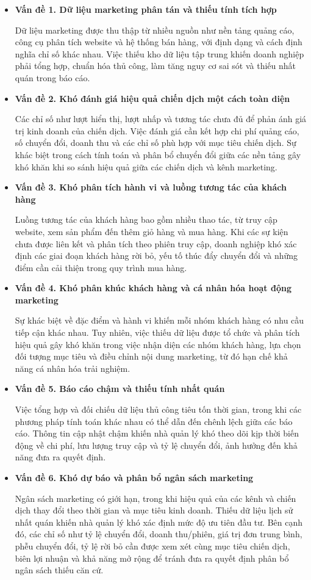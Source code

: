 \begin{itemize}
  \item \textbf{Vấn đề 1. Dữ liệu marketing phân tán và thiếu tính tích hợp}

  Dữ liệu marketing được thu thập từ nhiều nguồn như nền tảng quảng cáo, công cụ phân tích website và hệ thống bán hàng, với định dạng và cách định nghĩa chỉ số khác nhau. Việc thiếu kho dữ liệu tập trung khiến doanh nghiệp phải tổng hợp, chuẩn hóa thủ công, làm tăng nguy cơ sai sót và thiếu nhất quán trong báo cáo.
  \item \textbf{Vấn đề 2. Khó đánh giá hiệu quả chiến dịch một cách toàn diện}

  Các chỉ số như lượt hiển thị, lượt nhấp và tương tác chưa đủ để phản ánh giá trị kinh doanh của chiến dịch. Việc đánh giá cần kết hợp chi phí quảng cáo, số chuyển đổi, doanh thu và các chỉ số phù hợp với mục tiêu chiến dịch. Sự khác biệt trong cách tính toán và phân bổ chuyển đổi giữa các nền tảng gây khó khăn khi so sánh hiệu quả giữa các chiến dịch và kênh marketing.
  \item \textbf{Vấn đề 3. Khó phân tích hành vi và luồng tương tác của khách hàng}

  Luồng tương tác của khách hàng bao gồm nhiều thao tác, từ truy cập website, xem sản phẩm đến thêm giỏ hàng và mua hàng. Khi các sự kiện chưa được liên kết và phân tích theo phiên truy cập, doanh nghiệp khó xác định các giai đoạn khách hàng rời bỏ, yếu tố thúc đẩy chuyển đổi và những điểm cần cải thiện trong quy trình mua hàng.
  \item \textbf{Vấn đề 4. Khó phân khúc khách hàng và cá nhân hóa hoạt động marketing}

  Sự khác biệt về đặc điểm và hành vi khiến mỗi nhóm khách hàng có nhu cầu tiếp cận khác nhau. Tuy nhiên, việc thiếu dữ liệu được tổ chức và phân tích hiệu quả gây khó khăn trong việc nhận diện các nhóm khách hàng, lựa chọn đối tượng mục tiêu và điều chỉnh nội dung marketing, từ đó hạn chế khả năng cá nhân hóa trải nghiệm.
  \item \textbf{Vấn đề 5. Báo cáo chậm và thiếu tính nhất quán}

  Việc tổng hợp và đối chiếu dữ liệu thủ công tiêu tốn thời gian, trong khi các phương pháp tính toán khác nhau có thể dẫn đến chênh lệch giữa các báo cáo. Thông tin cập nhật chậm khiến nhà quản lý khó theo dõi kịp thời biến động về chi phí, lưu lượng truy cập và tỷ lệ chuyển đổi, ảnh hưởng đến khả năng đưa ra quyết định.
  \item \textbf{Vấn đề 6. Khó dự báo và phân bổ ngân sách marketing}

  Ngân sách marketing có giới hạn, trong khi hiệu quả của các kênh và chiến dịch thay đổi theo thời gian và mục tiêu kinh doanh. Thiếu dữ liệu lịch sử nhất quán khiến nhà quản lý khó xác định mức độ ưu tiên đầu tư. Bên cạnh đó, các chỉ số như tỷ lệ chuyển đổi, doanh thu/phiên, giá trị đơn trung bình, phễu chuyển đổi, tỷ lệ rời bỏ cần được xem xét cùng mục tiêu chiến dịch, biên lợi nhuận và khả năng mở rộng để tránh đưa ra quyết định phân bổ ngân sách thiếu căn cứ.
\end{itemize}


